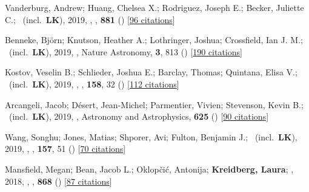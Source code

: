 \item[{\color{numcolor}\scriptsize30}] Vanderburg, Andrew; Huang, Chelsea X.; Rodriguez, Joseph E.; Becker, Juliette C.; \etal\ (incl.\ \textbf{LK}), 2019, , \apj, \textbf{881} () [\href{https://ui.adsabs.harvard.edu/abs/2019ApJ...881L..19V}{96 citations}]

\item[{\color{numcolor}\scriptsize29}] Benneke, Bj{\"o}rn; Knutson, Heather A.; Lothringer, Joshua; Crossfield, Ian J. M.; \etal\ (incl.\ \textbf{LK}), 2019, , Nature Astronomy, \textbf{3}, 813 () [\href{https://ui.adsabs.harvard.edu/abs/2019NatAs...3..813B}{190 citations}]

\item[{\color{numcolor}\scriptsize28}] Kostov, Veselin B.; Schlieder, Joshua E.; Barclay, Thomas; Quintana, Elisa V.; \etal\ (incl.\ \textbf{LK}), 2019, , \aj, \textbf{158}, 32 () [\href{https://ui.adsabs.harvard.edu/abs/2019AJ....158...32K}{112 citations}]

\item[{\color{numcolor}\scriptsize27}] Arcangeli, Jacob; D{\'e}sert, Jean-Michel; Parmentier, Vivien; Stevenson, Kevin B.; \etal\ (incl.\ \textbf{LK}), 2019, , Astronomy and Astrophysics, \textbf{625} () [\href{https://ui.adsabs.harvard.edu/abs/2019A&A...625A.136A}{90 citations}]

\item[{\color{numcolor}\scriptsize26}] Wang, Songhu; Jones, Matias; Shporer, Avi; Fulton, Benjamin J.; \etal\ (incl.\ \textbf{LK}), 2019, , \aj, \textbf{157}, 51 () [\href{https://ui.adsabs.harvard.edu/abs/2019AJ....157...51W}{70 citations}]

\item[{\color{numcolor}\scriptsize25}] Mansfield, Megan; Bean, Jacob L.; Oklop{\v{c}}i{\'c}, Antonija; \textbf{Kreidberg, Laura}; \etal, 2018, , \apj, \textbf{868} () [\href{https://ui.adsabs.harvard.edu/abs/2018ApJ...868L..34M}{87 citations}]

